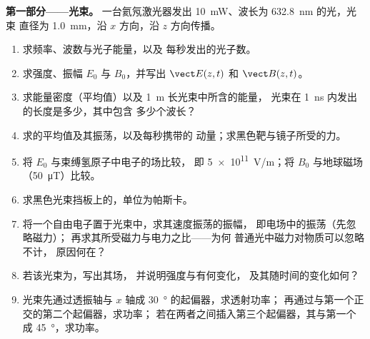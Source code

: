 \begin{problem}
\label{pb:b2:plane-waves-polarization:1}

\medskip
\noindent\textbf{第一部分——光束。}
一台氦氖激光器发出 \qty{10}{mW}、波长为 \qty{632.8}{nm} 的光，光束
直径为 \qty{1.0}{mm}，沿 $x$ 方向，沿
$z$ 方向传播。
\begin{enumerate}
  \item 求频率、波数与光子能量，以及
        每秒发出的光子数。
  \item 求强度、振幅 $E_0$ 与 $B_0$，并写出 $\vect E(z, t)$ 和
        $\vect B(z, t)$。
  \item 求能量密度（平均值）以及 \qty{1}{m} 长光束中所含的能量，
        光束在 \qty{1}{ns} 内发出的长度是多少，其中包含
        多少个波长？
  \item 求的平均值及其振荡，以及每秒携带的
        动量；求黑色靶与镜子所受的力。
  \item 将 $E_0$ 与束缚氢原子中电子的场比较，
        即 \qty{5e11}{V/m}；将 $B_0$ 与地球磁场
        （\qty{50}{\micro T}）比较。
  \item 求黑色光束挡板上的，单位为帕斯卡。
  \item 将一个自由电子置于光束中，求其速度振荡的振幅，
        即电场中的振荡（先忽略磁力）；
        再求其所受磁力与电力之比——为何
        普通光中磁力对物质可以忽略不计，
        原因何在？
  \item 若该光束为，写出其场，
        并说明强度与有何变化，
        及其随时间的变化如何？
  \item 光束先通过透振轴与 $x$ 轴成
        \qty{30}{\degree} 的起偏器，求透射功率；
        再通过与第一个正交的第二个起偏器，求功率；
        若在两者之间插入第三个起偏器，其与第一个成 \qty{45}{\degree}，求功率。
\end{enumerate}


\end{problem}
